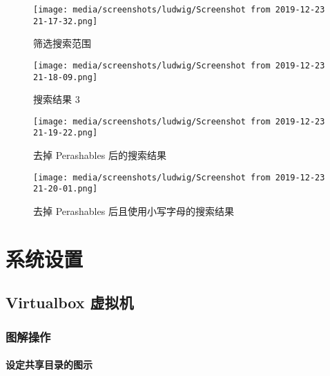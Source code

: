 \documentclass[
    11pt,
    base=hide,
    cite=authoryear,
    device=phone,
    lang=cn,
    mode=simple,
    result=answer,
    toc=onecol,
]{elegantbook_sierxue}
\begin{document}
\begin{figure}[!htbp]
  \centering
  \texttt{[image: media/screenshots/ludwig/Screenshot from 2019-12-23 21-17-32.png]}
  \caption{筛选搜索范围}%
  \label{fig:ludwig-filter}
\end{figure}

\begin{figure}[!htbp]
  \centering
  \texttt{[image: media/screenshots/ludwig/Screenshot from 2019-12-23 21-18-09.png]}
  \caption{搜索结果 3}%
  \label{fig:ludwig-result-3}
\end{figure}

\begin{figure}[!htbp]
  \centering
  \texttt{[image: media/screenshots/ludwig/Screenshot from 2019-12-23 21-19-22.png]}
  \caption{去掉 Perashables 后的搜索结果}%
  \label{fig:ludwig-result-4}
\end{figure}

\begin{figure}[!htbp]
  \centering
  \texttt{[image: media/screenshots/ludwig/Screenshot from
  2019-12-23 21-20-01.png]}
  \caption{去掉 Perashables 后且使用小写字母的搜索结果}%
  \label{fig:ludwig-result-5}
\end{figure}


%

\appendix

\chapter{系统设置}%
\label{cha:settings-system-a}

\section{Virtualbox 虚拟机}

\subsection{图解操作}%
\label{sub:vbox-graphic-illustration}

\subsubsection{设定共享目录的图示}%
\label{ssub:vbox-set-share-folder-a}
\end{document}
